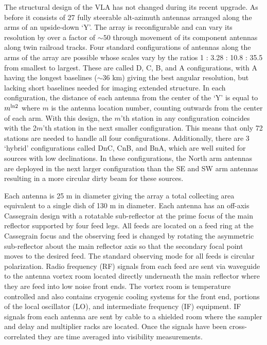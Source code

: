 The structural design of the VLA has not changed during its recent upgrade. As before it consists of 27 fully steerable alt-azimuth antennas arranged along the arms of an upside-down `Y'.  The array is reconfigurable and can vary its resolution by over a factor of $\sim 50$ through movement of its component antennas along twin railroad tracks. Four standard configurations of antennas along the arms of the array are possible whose scales vary by the ratios 1 : 3.28 : 10.8 : 35.5 from smallest to largest. These are called D, C, B, and A configurations, with A having the longest baselines ($\sim 36$ km) giving the best angular resolution, but lacking short baselines needed for imaging extended structure. In each configuration, the distance of each antenna from the center of the `Y' is equal to $m^{\rm{ln}2}$ where $m$ is the antenna location number, counting outwards from the center of each arm. With this design, the $m$'th station in any configuration coincides with the 2$m$'th station in the next smaller configuration. This means that only 72 stations are needed to handle all four configurations. Additionally, there are 3 `hybrid' configurations called DnC, CnB, and BnA, which are well suited for sources with low declinations. In these configurations, the North arm antennas are deployed in the next larger configuration than the SE and SW arm antennas resulting in a more circular dirty beam for these sources.

Each antenna is 25 m in diameter giving the array a total collecting area equivalent to a single dish of 130 m in diameter. Each antenna has an off-axis Cassegrain design with a rotatable sub-reflector at the prime focus of the main reflector supported by four feed legs. All feeds are located on a feed ring at the Cassegrain focus and the observing feed is changed by rotating the asymmetric sub-reflector about the main reflector axis so that the secondary focal point moves to the desired feed. The standard observing mode for all feeds is circular polarization. Radio frequency (RF) signals from each feed  are sent via waveguide to the antenna vortex room located directly underneath the main reflector where they are feed into low noise front ends. The vortex room is temperature controlled and also contains cryogenic cooling systems for the front end, portions of the local oscillator (LO), and intermediate frequency (IF) equipment. IF signals from each antenna are sent by cable to a shielded room where the sampler and delay and multiplier racks are located. Once the signals have been cross-correlated they are time averaged into visibility measurements.

